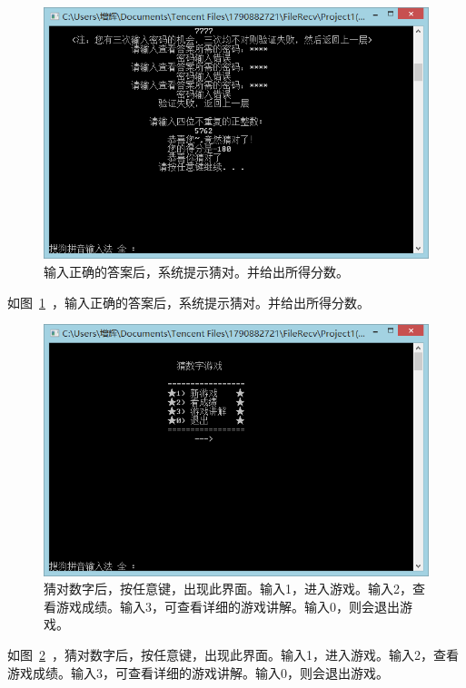 \begin{figure}[htp]
\includegraphics[width=\textwidth]{image/29.png}
\caption{\label{p9}输入正确的答案后，系统提示猜对。并给出所得分数。}
\end{figure}
 
如图~\ref{p9}~，输入正确的答案后，系统提示猜对。并给出所得分数。

\begin{figure}[htp]
\includegraphics[width=\textwidth]{image/30.png}
\caption{\label{p10}猜对数字后，按任意键，出现此界面。输入1，进入游戏。输入2，查看游戏成绩。输入3，可查看详细的游戏讲解。输入0，则会退出游戏。}
\end{figure}
 
如图~\ref{p10}~，猜对数字后，按任意键，出现此界面。输入1，进入游戏。输入2，查看游戏成绩。输入3，可查看详细的游戏讲解。输入0，则会退出游戏。

